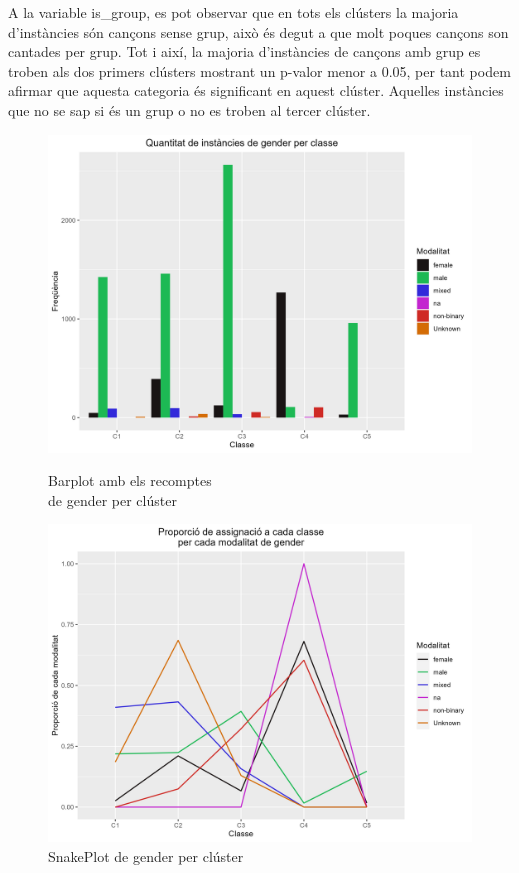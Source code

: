 \documentclass{article}
\begin{document}
A la variable is\_group, es pot observar que en tots els clústers la majoria d'instàncies són cançons sense grup, això és degut a que molt poques cançons son cantades per grup. Tot i així, la majoria d'instàncies de cançons amb grup es troben als dos primers clústers mostrant un p-valor menor a 0.05, per tant podem afirmar que aquesta categoria és significant en aquest clúster. Aquelles instàncies que no se sap si és un grup o no es troben al tercer clúster.

\begin{figure}[H]
\centering
    \begin{minipage}{.49\textwidth}
        \centering
        \includegraphics[width=0.95\linewidth]{Images/5_Profiling/categoriques/cat/Cat_BarPlot_gender.png}
        \caption{Barplot amb els recomptes \\ de gender per clúster}
        \label{fig:Cat_BarPlot_gender}
    \end{minipage}%
    \begin{minipage}{.49\textwidth}
        \centering
        \includegraphics[width=0.95\linewidth]{Images/5_Profiling/categoriques/cat/Cat_SnakePlot_gender.png}
        \caption{SnakePlot de gender per clúster}
        \label{fig:Cat_SnakePlot_gender}
    \end{minipage}%
\end{figure}
\end{document}
